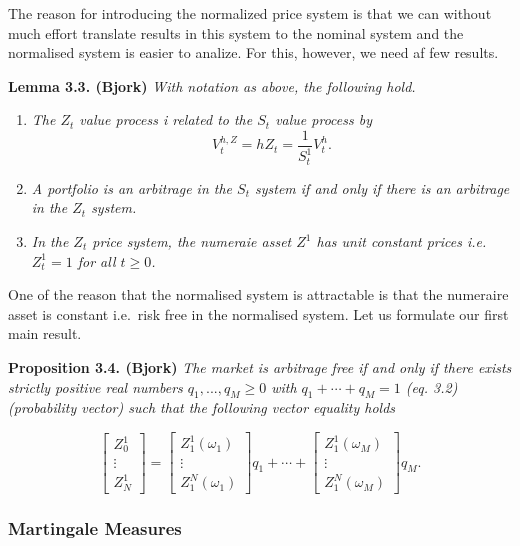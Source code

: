 \documentclass[
]{book}
\providecommand{\tightlist}{%
  \setlength{\itemsep}{0pt}\setlength{\parskip}{0pt}}
\begin{document}
The reason for introducing the normalized price system is that we can without much effort translate results in this system to the nominal system and the normalised system is easier to analize. For this, however, we need af few results.

\textbf{Lemma 3.3. (Bjork)} \emph{With notation as above, the following hold.}

\begin{enumerate}
\def\labelenumi{\arabic{enumi}.}
\tightlist
\item
  \emph{The \(Z_t\) value process i related to the \(S_t\) value process by}
  \[
    V_t^{h,Z}=hZ_t=\frac{1}{S_t^1}V_t^h.
    \]
\item
  \emph{A portfolio is an arbitrage in the \(S_t\) system if and only if there is an arbitrage in the \(Z_t\) system.}
\item
  \emph{In the \(Z_t\) price system, the numeraie asset \(Z^1\) has unit constant prices i.e.~\(Z_t^1=1\) for all \(t\ge 0\).}
\end{enumerate}

One of the reason that the normalised system is attractable is that the numeraire asset is constant i.e.~risk free in the normalised system. Let us formulate our first main result.

\textbf{Proposition 3.4. (Bjork)} \emph{The market is arbitrage free if and only if there exists strictly positive real numbers \(q_1,...,q_M\ge 0\) with \(q_1+\cdots + q_M=1\) (eq. 3.2) (probability vector) such that the following vector equality holds}

\[
\begin{bmatrix} Z_0^1\\
\vdots\\
Z_N^1\end{bmatrix}=\begin{bmatrix} Z_1^1(\omega_1)\\
\vdots\\
Z_1^N(\omega_1)\end{bmatrix}q_1+\cdots +\begin{bmatrix} Z_1^1(\omega_M)\\
\vdots\\
Z_1^N(\omega_M)\end{bmatrix}q_M.\tag{3.3}
\]

\hypertarget{martingale-measures}{%
\subsubsection{Martingale Measures}\label{martingale-measures}}
\end{document}
